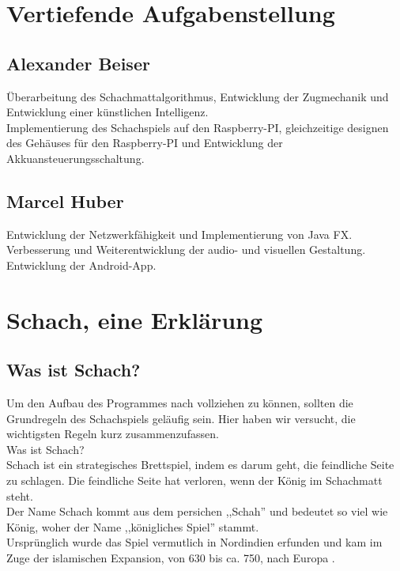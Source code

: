 \documentclass[12pt,a4paper]{article}
\newcommand{\cmnt}[1]{}			%
\newcommand{\yhbu}[0]{\color{ydkbu}}	%
\begin{document}
{\cmnt{
	{\yhbu
	In der Einleitung wird erklärt,
	wieso man sich für dieses Thema entschieden hat.
	(Zielsetzung und Aufgabenstellung des Gesamtprojekts,
	fachliches und wirtschaftliches Umfeld)
	}
	}
\section{\sc Vertiefende Aufgabenstellung}
 \subsection{Alexander Beiser}
 	Überarbeitung des Schachmattalgorithmus, Entwicklung der Zugmechanik und Entwicklung einer künstlichen Intelligenz. \\
Implementierung des Schachspiels auf den Raspberry-PI, gleichzeitige designen des Gehäuses für den Raspberry-PI und Entwicklung der Akkuansteuerungsschaltung. 
	
 \subsection{Marcel Huber}
	Entwicklung der Netzwerkfähigkeit und Implementierung von Java FX.
Verbesserung und Weiterentwicklung der audio- und visuellen Gestaltung.
Entwicklung der Android-App.


\clearpage\vfill\newpage{}

\section{Schach, eine Erklärung}
\label{SEC:CHESS}

\subsection{Was ist Schach?}
\label{SUBSEC:CHESS-EXPLAIN}
Um den Aufbau des Programmes nach vollziehen zu können, sollten die Grundregeln des Schachspiels geläufig sein. Hier haben wir versucht, die wichtigsten Regeln kurz zusammenzufassen. \\
Was ist Schach? \\
Schach ist ein strategisches Brettspiel, indem es darum geht, die feindliche Seite zu schlagen. Die feindliche Seite hat verloren, wenn der König im Schachmatt steht. \\
Der Name Schach kommt aus dem persichen ,,Schah'' und bedeutet so viel wie König, woher der Name ,,königliches Spiel'' stammt. \\
Ursprünglich wurde das Spiel vermutlich in Nordindien erfunden und kam im Zuge der islamischen Expansion, von 630 bis ca. 750, nach Europa \cite{wiki:chess}.


}
\end{document}
